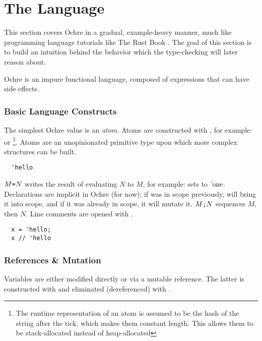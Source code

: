 \documentclass[12pt,twoside]{report}
\begin{document}

\cleardoublepage
\section{The Language}
This section covers Ochre in a gradual, example-heavy manner, much like programming language tutorials like The Rust Book \citep{RustProgrammingLanguagea}. The goal of this section is to build an intuition behind the behavior which the type-checking will later reason about.

Ochre is an impure functional language, composed of expressions that can have side effects.

\subsubsection{Basic Language Constructs}
The simplest Ochre value is an \textit{atom}. Atoms are constructed with , for example:  or \footnote{The runtime representation of an atom is assumed to be the hash of the string after the tick, which makes them constant length. This allows them to be stack-allocated instead of heap-allocated}. Atoms are an unopinionated primitive type upon which more complex structures can be built.

\begin{verbatim}
  'hello
\end{verbatim}

$M \text{\texttt{=}} N$ writes the result of evaluating $N$ to $M$, for example:  sets  to $\text{'one}$. Declarations are implicit in Ochre (for now); if  was in scope previously,  will bring it into scope, and if it was already in scope, it will mutate it. $M \text{\texttt{;}} N$ sequences $M$, then $N$. Line comments are opened with \mono{//}.

\begin{verbatim}
  x = 'hello;
  x // 'hello
\end{verbatim}

\subsubsection{References \& Mutation}
Variables are either modified directly or via a mutable reference. The latter is constructed with  and eliminated (dereferenced) with \mono{*}.
\end{document}
